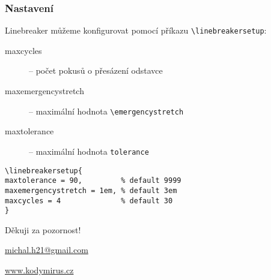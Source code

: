 \begin{frame}[fragile]
  \frametitle{Nastavení}
  Linebreaker můžeme konfigurovat pomocí příkazu \verb|\linebreakersetup|:
  \begin{description}
    \item[maxcycles] -- počet pokusů o přesázení odstavce
    \item[maxemergencystretch] -- maximální hodnota \verb|\emergencystretch|
    \item[maxtolerance]  -- maximální hodnota \verb|tolerance|
  \end{description}
\begin{verbatim}
\linebreakersetup{
maxtolerance = 90,         % default 9999
maxemergencystretch = 1em, % default 3em
maxcycles = 4              % default 30
}
\end{verbatim}

\end{frame}


\begin{frame}[standout]

 
  Děkuji za pozornost!

  \url{michal.h21@gmail.com}

  \url{www.kodymirus.cz}

\end{frame}
